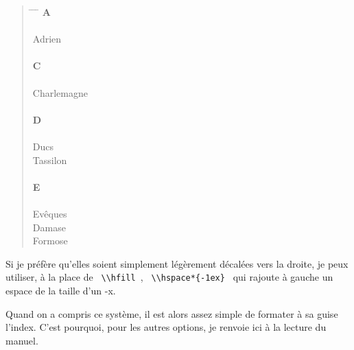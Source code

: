 \begin{quotation}
\begin{tabbing}
\hspace{0,5cm}  \= \hspace{1cm} \= \hspace{1,5cm} \= \kill
\>\> \large{\textbf{A}}\\
\\
Adrien\>\> \\
\\
\>\> \large{\textbf{C}}\\
\\
Charlemagne \>\> \\
\\
\>\> \large{\textbf{D}}\\
\\
Ducs \\
\> Tassilon\>\\
\\
\>\> \large{\textbf{E}}\\
\\
Evêques \\
\> Damase \>\\
\> Formose\>\\

\end{tabbing}
\end{quotation}

Si je préfère qu'elles soient simplement légèrement décalées vers la droite, je peux utiliser, à la place de \verb| \\hfill |, \verb| \\hspace*{-1ex} |  qui rajoute à gauche un espace de la taille d'un -x. 


Quand on a compris ce système, il est alors assez simple de formater à sa guise l'index. C'est pourquoi, pour les autres options, je renvoie ici à la lecture du manuel.



